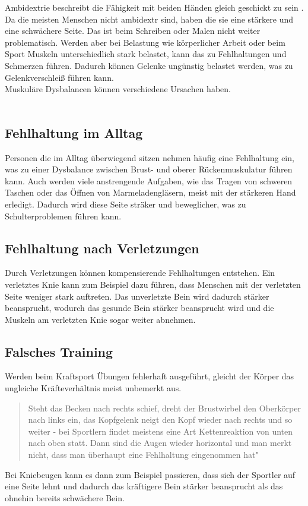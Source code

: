 
Ambidextrie beschreibt die Fähigkeit mit beiden Händen gleich geschickt zu sein \cite{wissen}. Da die meisten  Menschen nicht ambidextr sind, haben die sie eine stärkere und eine schwächere Seite. Das ist beim Schreiben oder Malen nicht weiter problematisch. Werden aber bei Belastung wie körperlicher Arbeit oder beim Sport Muskeln unterschiedlich stark belastet, kann das zu Fehlhaltungen und Schmerzen führen. Dadurch können Gelenke ungünstig belastet werden, was zu Gelenkverschleiß führen kann.\\
Muskuläre Dysbalancen können verschiedene Ursachen haben. \\
\\
 \subsection{Fehlhaltung im Alltag}
 Personen die im Alltag überwiegend sitzen nehmen häufig eine Fehlhaltung ein, was zu einer Dysbalance zwischen Brust- und oberer Rückenmuskulatur führen kann. Auch werden viele anstrengende Aufgaben, wie das Tragen von schweren Taschen oder das Öffnen von Marmeladengläsern, meist mit der stärkeren Hand erledigt. Dadurch wird diese Seite sträker und beweglicher, was zu Schulterproblemen führen kann.

 \subsection{Fehlhaltung nach Verletzungen}
 Durch Verletzungen können kompensierende Fehlhaltungen entstehen. Ein verletztes Knie kann zum Beispiel dazu führen, dass Menschen mit der verletzten Seite weniger stark auftreten. Das unverletzte Bein wird dadurch stärker beansprucht, wodurch das gesunde Bein stärker beansprucht wird und die Muskeln am verletzten Knie sogar weiter abnehmen.

 \subsection{Falsches Training}
Werden beim Kraftsport Übungen fehlerhaft ausgeführt, gleicht der Körper das ungleiche Kräfteverhältnis meist unbemerkt aus.

\begin{quote}
Steht das Becken nach rechts schief, dreht der Brustwirbel den Oberkörper nach links ein, das Kopfgelenk neigt den Kopf wieder nach rechts und so weiter - bei Sportlern findet meistens eine Art Kettenreaktion von unten nach oben statt. Dann sind die Augen wieder horizontal und man merkt nicht, dass man überhaupt eine Fehlhaltung eingenommen hat" \cite{MensHealth}
\end{quote}
Bei Kniebeugen kann es dann zum Beispiel passieren, dass sich der Sportler auf eine Seite lehnt und dadurch das kräftigere Bein stärker beansprucht als das ohnehin bereits schwächere Bein. \\
\\

